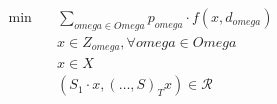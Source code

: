 \begin{align}
  \min\quad & \sum_{\mathit{omega} \in \mathit{Omega}} p_{\mathit{omega}} \cdot f \left(x , d_{\mathit{omega}}\right) \tag{eq\_0001} \\
  & x \in Z_{\mathit{omega}} , \forall \mathit{omega} \in \mathit{Omega} \tag{eq\_0002} \\
  & x \in X \tag{eq\_0006} \\
  & \left(S_{1} \cdot x , \left(\hdots , S\right)_{T} x\right) \in \mathcal{R} \tag{eq\_0007} \\
\end{align}
